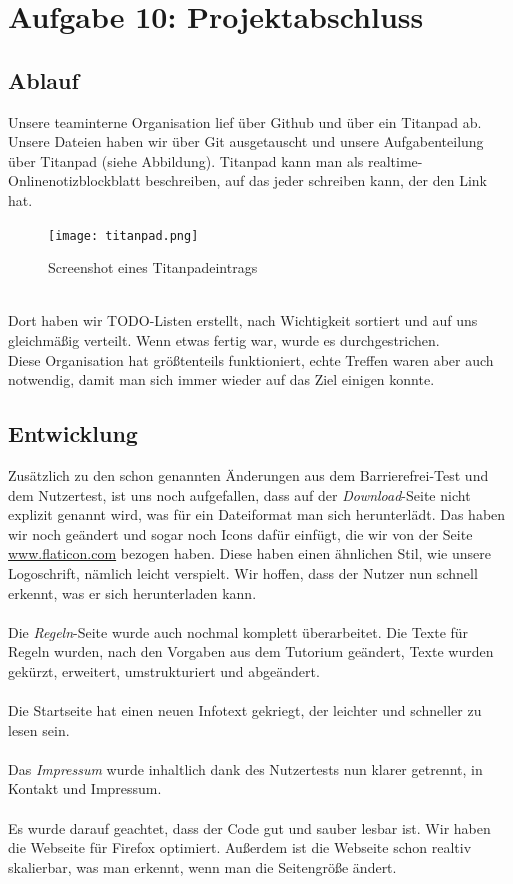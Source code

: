 \documentclass{scrartcl}
\begin{document}
\section*{Aufgabe 10: Projektabschluss}

\subsection*{Ablauf}
Unsere teaminterne Organisation lief über Github und über ein Titanpad ab. Unsere Dateien haben wir über Git ausgetauscht und unsere Aufgabenteilung über Titanpad (siehe Abbildung). Titanpad kann man als realtime-Onlinenotizblockblatt beschreiben, auf das jeder schreiben kann, der den Link hat.
\begin{figure}[H]
 \centering
   \texttt{[image: titanpad.png]}
\caption{Screenshot eines Titanpadeintrags}
\end{figure}\ \\
Dort haben wir TODO-Listen erstellt, nach Wichtigkeit sortiert und auf uns gleichmäßig verteilt. Wenn etwas fertig war, wurde es durchgestrichen. \\
Diese Organisation hat größtenteils funktioniert, echte Treffen waren aber auch notwendig, damit man sich immer wieder auf das Ziel einigen konnte.

\subsection*{Entwicklung}
Zusätzlich zu den schon genannten Änderungen aus dem Barrierefrei-Test und dem Nutzertest, ist uns noch aufgefallen, dass auf der \textit{Download}-Seite nicht explizit genannt wird, was für ein Dateiformat man sich herunterlädt. Das haben wir noch geändert und sogar noch Icons dafür einfügt, die wir von der Seite \url{www.flaticon.com} bezogen haben. Diese haben einen ähnlichen Stil, wie unsere Logoschrift, nämlich leicht verspielt. Wir hoffen, dass der Nutzer nun schnell erkennt, was er sich herunterladen kann.\\
\\
Die \textit{Regeln}-Seite wurde auch nochmal komplett überarbeitet.
Die Texte für Regeln wurden, nach den Vorgaben aus dem Tutorium geändert, Texte wurden gekürzt, erweitert, umstrukturiert und abgeändert.\\ \\
Die Startseite hat einen neuen Infotext gekriegt, der leichter und schneller zu lesen sein.\\ \\
Das \textit{Impressum} wurde inhaltlich dank des Nutzertests nun klarer getrennt, in Kontakt und Impressum. \\ \\
Es wurde darauf geachtet, dass der Code gut und sauber lesbar ist. Wir haben die Webseite für Firefox optimiert. Außerdem ist die Webseite schon realtiv skalierbar, was man erkennt, wenn man die Seitengröße ändert.
\end{document}
